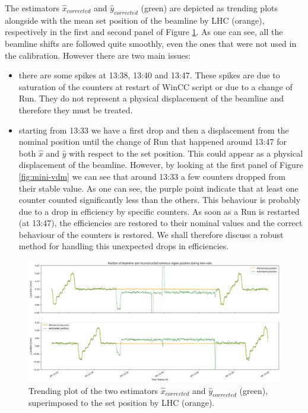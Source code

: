 The estimators $\hat{x}_{corrected}$ and $\hat{y}_{corrected}$ (green) are depicted as trending plots alongside with the mean set position of the beamline by LHC (orange), respectively in the first and second panel of Figure \ref{fig:traceplot_outliers}. As one can see, all the beamline shifts are followed quite smoothly, even the ones that were not used in the calibration. However there are two main issues:
\begin{itemize}
    \item there are some spikes at 13:38, 13:40 and 13:47. These spikes are due to saturation of the counters at restart of WinCC script or due to a change of Run. They do not represent a physical displacement of the beamline and therefore they must be treated.
    \item starting from 13:33 we have a first drop and then a displacement from the nominal position until the change of Run that happened around 13:47 for both $\hat{x}$ and $\hat{y}$ with respect to the set position. This could appear as a physical displacement of the beamline. However, by looking at the first panel of Figure \ref{fig:mini-vdm} we can see that around 13:33 a few counters dropped from their stable value. As one can see, the purple point indicate that at least one counter counted significantly less than the others. This behaviour is probably due to a drop in efficiency by specific counters. As soon as a Run is restarted (at 13:47), the efficiencies are restored to their nominal values and the correct behaviour of the counters is restored. We shall therefore discuss a robust method for handling this unexpected drops in efficiencies.
\end{itemize}

\begin{figure}
    \centering
    \includegraphics[width=\textwidth]{figures/traceplot_wo_median.png}
    \caption{Trending plot of the two estimators $\hat{x}_{corrected}$ and $\hat{y}_{corrected}$ (green), superimposed to the set position by LHC (orange).  }
    \label{fig:traceplot_outliers}
\end{figure}

